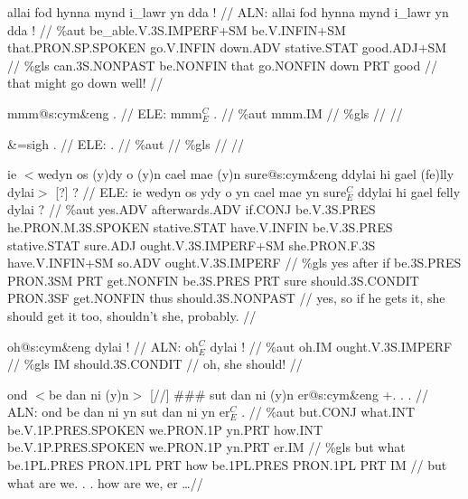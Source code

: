 \documentclass[a4paper,10pt]{article}
\begin{document}
\ex
\begingl[lingstyle=gergl]
\glchat allai fod hynna mynd i\_lawr yn dda ! //
\glsurface ALN:  allai fod hynna mynd i\_lawr yn dda !  //
\glauto \%aut  be\_able{\scriptsize .V.3S.IMPERF+SM} be{\scriptsize .V.INFIN+SM} that{\scriptsize .PRON.SP.SPOKEN} go{\scriptsize .V.INFIN} down{\scriptsize .ADV} stative{\scriptsize .STAT} good{\scriptsize .ADJ+SM}   //
\glmanual \%gls  can{\scriptsize .3S.NONPAST} be{\scriptsize .NONFIN} that go{\scriptsize .NONFIN} down PRT good   //
\gleng that might go down well! //
\endgl
\xe

\ex
\begingl[lingstyle=gergl]
\glchat mmm@s:cym\&eng . //
\glsurface ELE:  mmm$^{C}_{E}$ .  //
\glauto \%aut  mmm{\scriptsize .IM}   //
\glmanual \%gls     //
\gleng  //
\endgl
\xe

\ex
\begingl[lingstyle=gergl]
\glchat \&=sigh . //
\glsurface ELE:  .  //
\glauto \%aut    //
\glmanual \%gls    //
\gleng  //
\endgl
\xe

\ex
\begingl[lingstyle=gergl]
\glchat ie $<$wedyn os (y)dy o (y)n cael mae (y)n sure@s:cym\&eng ddylai hi gael (fe)lly dylai$>$ [?] ? //
\glsurface ELE:  ie wedyn os ydy o yn cael mae yn sure$^{C}_{E}$ ddylai hi gael felly dylai ?  //
\glauto \%aut  yes{\scriptsize .ADV} afterwards{\scriptsize .ADV} if{\scriptsize .CONJ} be{\scriptsize .V.3S.PRES} he{\scriptsize .PRON.M.3S.SPOKEN} stative{\scriptsize .STAT} have{\scriptsize .V.INFIN} be{\scriptsize .V.3S.PRES} stative{\scriptsize .STAT} sure{\scriptsize .ADJ} ought{\scriptsize .V.3S.IMPERF+SM} she{\scriptsize .PRON.F.3S} have{\scriptsize .V.INFIN+SM} so{\scriptsize .ADV} ought{\scriptsize .V.3S.IMPERF}   //
\glmanual \%gls  yes after if be{\scriptsize .3S.PRES} PRON{\scriptsize .3SM} PRT get{\scriptsize .NONFIN} be{\scriptsize .3S.PRES} PRT sure should{\scriptsize .3S.CONDIT} PRON{\scriptsize .3SF} get{\scriptsize .NONFIN} thus should{\scriptsize .3S.NONPAST}   //
\gleng yes, so if he gets it, she should get it too, shouldn't she, probably. //
\endgl
\xe

\ex
\begingl[lingstyle=gergl]
\glchat oh@s:cym\&eng dylai ! //
\glsurface ALN:  oh$^{C}_{E}$ dylai !  //
\glauto \%aut  oh{\scriptsize .IM} ought{\scriptsize .V.3S.IMPERF}   //
\glmanual \%gls  IM should{\scriptsize .3S.CONDIT}   //
\gleng oh, she should! //
\endgl
\xe

\ex
\begingl[lingstyle=gergl]
\glchat ond $<$be dan ni (y)n$>$ [//] \#\#\# sut dan ni (y)n er@s:cym\&eng +. . . //
\glsurface ALN:  ond be dan ni yn sut dan ni yn er$^{C}_{E}$ .  //
\glauto \%aut  but{\scriptsize .CONJ} what{\scriptsize .INT} be{\scriptsize .V.1P.PRES.SPOKEN} we{\scriptsize .PRON.1P} yn{\scriptsize .PRT} how{\scriptsize .INT} be{\scriptsize .V.1P.PRES.SPOKEN} we{\scriptsize .PRON.1P} yn{\scriptsize .PRT} er{\scriptsize .IM}   //
\glmanual \%gls  but what be{\scriptsize .1PL.PRES} PRON{\scriptsize .1PL} PRT how be{\scriptsize .1PL.PRES} PRON{\scriptsize .1PL} PRT IM   //
\gleng but what are we. . . how are we, er \dots  //
\endgl
\xe
\end{document}

